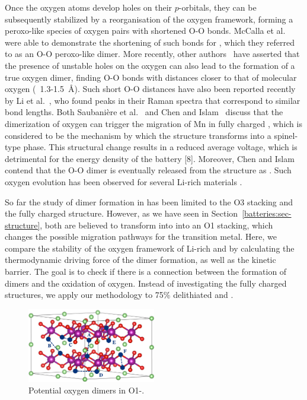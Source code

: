 \begin{refsection}
Once the oxygen atoms develop holes on their $p$-orbitals, they can be 
subsequently stabilized by a reorganisation of the oxygen framework, forming a 
peroxo-like species of oxygen pairs with shortened O-O bonds. McCalla et 
al.~\cite{McCalla2015} were able to demonstrate the shortening of such bonds 
for , which they referred to as an O-O peroxo-like dimer. More 
recently, other authors~\cite{Saubanere2016, Chen2016} have asserted that the 
presence of unstable holes on the oxygen can also lead to the formation of a 
true oxygen dimer, finding O-O bonds with distances closer to that of 
molecular oxygen (~1.3-1.5~\si{\angstrom}). Such short O-O distances have also 
been reported recently by Li et al.~\cite{Li2018}, who found peaks in their 
Raman spectra that correspond to similar bond lengths. Both Saubani\`ere et 
al.~\cite{Saubanere2016} and Chen and Islam~\cite{Chen2016} discuss that the 
dimerization of oxygen can trigger the migration of Mn in fully charged 
, which is considered to be the mechanism by which the structure 
transforms into a spinel-type phase. This structural change results in a 
reduced average voltage, which is detrimental for the energy density of the 
battery [8]. Moreover, Chen and Islam contend that the O-O dimer is eventually 
released from the structure as . Such oxygen evolution has been 
observed for several Li-rich materials \cite{Armstrong2006, Luo2016}.  
 
So far the study of dimer formation in  has been limited to the O3 
stacking and the fully charged structure. However, as we have seen in 
Section~\ref{batteries:sec-structure}, both   are 
believed to transform into into an O1 stacking, which changes the possible 
migration pathways for the transition metal. Here, we compare the stability of 
the oxygen framework of Li-rich  and  by calculating 
the thermodynamic driving force of the dimer formation, as well as the kinetic 
barrier. The goal is to check if there is a connection between the formation 
of dimers and the oxidation of oxygen. Instead of investigating the fully 
charged structures, we apply our methodology to 75\% delithiated 
 and .  
 
\begin{figure} 
\centering 
\includegraphics[width=0.5\textwidth]{Figures/batteries/oxygen_dimers.png} 
\caption{Potential oxygen dimers in O1-.} 
\label{batteries:fig-oxygen_dimers}  
\end{figure} 
 

\end{refsection}
